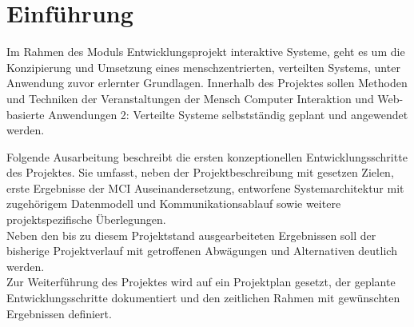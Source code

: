 
\chapter{Einführung}
Im Rahmen des Moduls Entwicklungsprojekt interaktive Systeme, geht es um die Konzipierung und Umsetzung eines menschzentrierten, verteilten Systems, unter Anwendung zuvor erlernter Grundlagen. Innerhalb des Projektes sollen Methoden und Techniken der Veranstaltungen der Mensch Computer Interaktion und Web-basierte Anwendungen 2: Verteilte Systeme selbstständig geplant und angewendet werden.

\vspace{0.2cm}

Folgende Ausarbeitung beschreibt die ersten konzeptionellen Entwicklungsschritte des Projektes. Sie umfasst, neben der  Projektbeschreibung mit gesetzen Zielen, erste Ergebnisse der MCI Auseinandersetzung, entworfene Systemarchitektur mit zugehörigem Datenmodell und Kommunikationsablauf sowie weitere projektspezifische Überlegungen.\\
Neben den bis zu diesem Projektstand ausgearbeiteten Ergebnissen soll der bisherige Projektverlauf mit getroffenen Abwägungen und Alternativen deutlich werden.\\
Zur Weiterführung des Projektes wird auf ein Projektplan gesetzt, der geplante Entwicklungsschritte dokumentiert und den zeitlichen Rahmen mit gewünschten Ergebnissen definiert.
